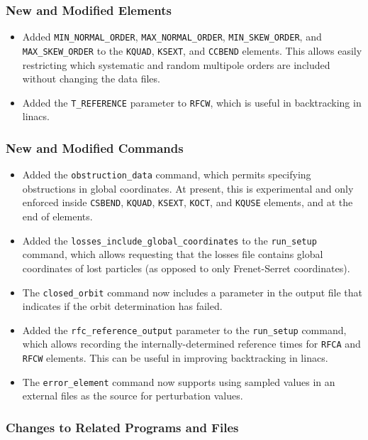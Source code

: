 \documentclass[11pt]{article}
\begin{document}
\subsubsection{New and Modified Elements}
\begin{itemize}
\item Added \verb|MIN_NORMAL_ORDER|, \verb|MAX_NORMAL_ORDER|, \verb|MIN_SKEW_ORDER|, and \verb|MAX_SKEW_ORDER| to the
\verb|KQUAD|, \verb|KSEXT|, and \verb|CCBEND| elements.  This allows easily restricting which systematic and random
multipole orders are included without changing the data files.
\item Added the \verb|T_REFERENCE| parameter to \verb|RFCW|, which is useful in backtracking in linacs.
\end{itemize}

\subsubsection{New and Modified Commands}
\begin{itemize}
\item Added the \verb|obstruction_data| command, which permits specifying obstructions in global coordinates.  At
present, this is experimental and only enforced inside \verb|CSBEND|, \verb|KQUAD|, \verb|KSEXT|, \verb|KOCT|, and
\verb|KQUSE| elements, and at the end of elements.
\item Added the \verb|losses_include_global_coordinates| to the \verb|run_setup| command, which allows requesting that
the losses file contains global coordinates of lost particles (as opposed to only Frenet-Serret coordinates).
\item The \verb|closed_orbit| command now includes a parameter in the output file that indicates if the orbit
determination has failed.
\item Added the \verb|rfc_reference_output| parameter to the \verb|run_setup| command, which allows recording the
internally-determined reference times for \verb|RFCA| and \verb|RFCW| elements. This can be useful in improving
backtracking in linacs.
\item The \verb|error_element| command now supports using sampled values in an external files as the source for
perturbation values.
\end{itemize}

\subsubsection{Changes to Related Programs and Files}
\end{document}
